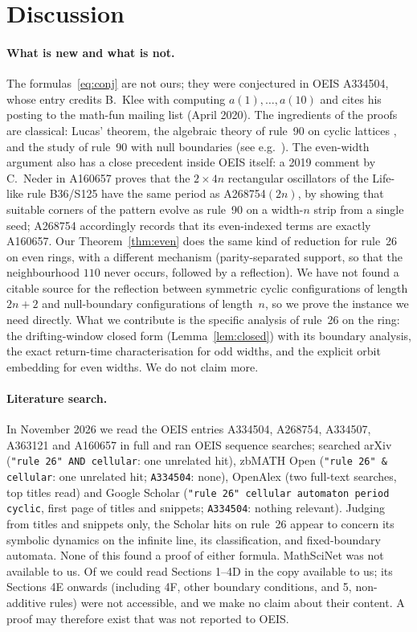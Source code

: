 \documentclass[11pt]{article}
\theoremstyle{definition}
\theoremstyle{remark}
\begin{document}
\section{Discussion}\label{sec:discussion}

\paragraph{What is new and what is not.}
The formulas~\eqref{eq:conj} are not ours; they were conjectured in OEIS
A334504, whose entry credits B.~Klee with computing $a(1),\dots,a(10)$ and
cites his posting to the math-fun mailing list (April 2020). The ingredients of the proofs are
classical: Lucas' theorem, the algebraic theory of rule~90 on cyclic lattices
\cite{mow}, and the study of rule~90 with null boundaries (see e.g.\
\cite{tadaki}). The even-width argument also has a close precedent inside
OEIS itself: a 2019 comment by C.~Neder in A160657 proves that the
$2 \times 4n$ rectangular oscillators of the Life-like rule B36/S125 have the
same period as A268754$(2n)$, by showing that suitable corners of the pattern
evolve as rule~90 on a width-$n$ strip from a single seed; A268754 accordingly
records that its even-indexed terms are exactly A160657. Our Theorem~\ref{thm:even}
does the same kind of reduction for rule~26 on even rings, with a different
mechanism (parity-separated support, so that the neighbourhood $110$ never
occurs, followed by a reflection). We have not found a citable source for the
reflection between symmetric cyclic configurations of length $2n+2$ and
null-boundary configurations of length~$n$, so we prove the instance we need
directly. What we contribute is the specific analysis of rule~26 on the ring:
the drifting-window closed form (Lemma~\ref{lem:closed}) with its boundary
analysis, the exact return-time characterisation for odd widths, and the
explicit orbit embedding for even widths. We do not claim more.

\paragraph{Literature search.}
In November 2026 we read the OEIS entries A334504, A268754, A334507,
A363121 and A160657 in full and ran OEIS sequence searches; searched arXiv
(\texttt{"rule 26" AND cellular}: one unrelated hit), zbMATH Open
(\texttt{"rule 26" \& cellular}: one unrelated hit; \texttt{A334504}: none),
OpenAlex (two full-text searches, top titles read) and Google Scholar
(\texttt{"rule 26" cellular automaton period cyclic}, first page of titles and
snippets; \texttt{A334504}: nothing relevant). Judging from titles and snippets only, the Scholar hits on rule~26
appear to concern its symbolic dynamics on the infinite line, its classification, and
fixed-boundary automata. None of this
found a proof of either formula. MathSciNet was not available to us. Of
\cite{mow} we could read Sections 1--4D in the copy available to us; its
Sections 4E onwards (including 4F, other boundary conditions, and 5,
non-additive rules) were not accessible, and we make no claim about their content. A proof may therefore
exist that was not reported to OEIS.
\end{document}
